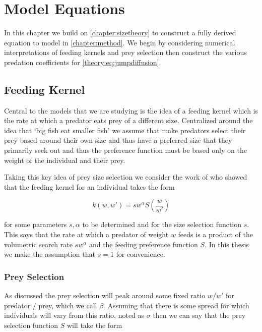 \documentclass[../main]{subfiles}
\begin{document}
  \chapter{Model Equations}\label{chapter:modelequations}

  In this chapter we build on \autoref{chapter:sizetheory} to construct a fully derived equation to model in \autoref{chapter:method}. We begin by considering numerical interpretations of feeding kernels and prey selection then construct the various predation coefficients for \autoref{theory:eq:jumpdiffusion}.

  \section{Feeding Kernel}
  Central to the models that we are studying is the idea of a feeding kernel which is the rate at which a predator eats prey of a different size. Centralized around the idea that `big fish eat smaller fish' we assume that make predators select their prey based around their own size and thus have a preferred size that they primarily seek out and thus the preference function must be based only on the weight of the individual and their prey.

  Taking this key idea of prey size selection we consider the work of \cite{benoit2004} who showed that the feeding kernel for an individual takes the form

  \begin{equation}\label{model:eq:kernel}
    k(w, w') = s w^{\alpha} S\left( \frac{w}{w'} \right)
  \end{equation}

  for some parameters $s, \alpha$ to be determined and for the size selection function $s$. This says that the rate at which a predator of weight $w$ feeds is a product of the volumetric search rate $s w^{\alpha}$ and the feeding preference function $S$. In this thesis we make the assumption that $s = 1$ for convenience.

  \subsection{Prey Selection}
  As discussed the prey selection will peak around some fixed ratio $w / w'$ for predator / prey, which we call $\beta$. Assuming that there is some spread for which individuals will vary from this ratio, noted as $\sigma$ then we can say that the prey selection function $S$ will take the form
\end{document}
